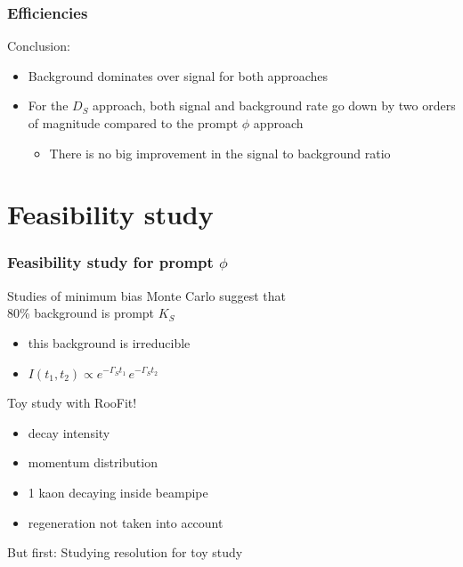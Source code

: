 \documentclass{beamer}
\begin{document}
\begin{frame}
\frametitle{Efficiencies}
Conclusion:
\begin{itemize}
\item Background dominates over signal for both approaches
\item For the $D_S$ approach, both signal and background rate go down by two orders of magnitude compared to the prompt $\phi$ approach
\begin{itemize}
\item There is no big improvement in the signal to background ratio
\end{itemize}
\end{itemize}

\end{frame}







\section{Feasibility study}





\LogoOff
\begin{frame}[fragile]
\frametitle{Feasibility study for prompt $\phi$}

Studies of minimum bias Monte Carlo suggest that \\80\% background is prompt $K_S$
\begin{itemize}
\item this background is irreducible
\item $I(t_1,t_2) \propto e^{-\Gamma_St_1} \,e^{-\Gamma_St_2}$
\end{itemize}
\vspace*{6pt}
Toy study with RooFit!
\begin{itemize}
\item decay intensity
\item momentum distribution
\item 1 kaon decaying inside beampipe
\item regeneration not taken into account
\end{itemize}
\vspace*{6pt}
But first: Studying resolution for toy study
\end{frame}
\end{document}
